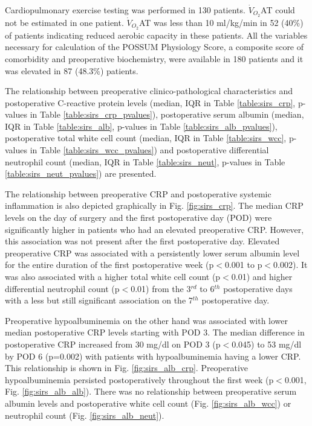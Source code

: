 Cardiopulmonary exercise testing was performed in 130 patients. 
$\dot{V}_{O_2}$AT could not be estimated in one patient.
$\dot{V}_{O_2}$AT was less than 10 ml/kg/min in 52 (40\%) of patients indicating reduced aerobic capacity in these patients.
All the variables necessary for calculation of the POSSUM Physiology Score, a composite score of comorbidity and preoperative biochemistry, were available in 180 patients and it was elevated in 87 (48.3\%) patients.

The relationship between preoperative clinico-pathological characteristics and postoperative C-reactive protein levels (median, IQR in Table \ref{table:sirs_crp}, p-values in Table \ref{table:sirs_crp_pvalues}), postoperative serum albumin (median, IQR in Table \ref{table:sirs_alb}, p-values in Table \ref{table:sirs_alb_pvalues}), postoperative total white cell count (median, IQR in Table \ref{table:sirs_wcc}, p-values in Table \ref{table:sirs_wcc_pvalues}) and postoperative differential neutrophil count (median, IQR in Table \ref{table:sirs_neut}, p-values in Table \ref{table:sirs_neut_pvalues}) are presented.

The relationship between preoperative CRP and postoperative systemic inflammation is also depicted graphically in Fig. \ref{fig:sirs_crp}. 
The median CRP levels on the day of surgery and the first postoperative day (POD) were significantly higher in patients who had an elevated preoperative CRP. 
However, this association was not present after the first postoperative day.
Elevated preoperative CRP was associated with a persistently lower serum albumin level for the entire duration of the first postoperative week (p$<$0.001 to p$<$0.002).
It was also associated with a higher total white cell count (p$<$0.01) and higher differential neutrophil count (p$<$0.01) from the 3$^{rd}$ to 6$^{th}$ postoperative days with a less but still significant association on the 7$^{th}$ postoperative day. 

Preoperative hypoalbuminemia on the other hand was associated with lower median postoperative CRP levels starting with POD 3. 
The median difference in postoperative CRP increased from 30 mg/dl on POD 3 (p$<$0.045) to 53 mg/dl by POD 6 (p=0.002) with patients with hypoalbuminemia having a lower CRP. 
This relationship is shown in Fig. \ref{fig:sirs_alb_crp}.
Preoperative hypoalbuminemia persisted postoperatively throughout the first week (p$<$0.001, Fig. \ref{fig:sirs_alb_alb}).
There was no relationship between preoperative serum albumin levels and postoperative white cell count (Fig. \ref{fig:sirs_alb_wcc}) or neutrophil count (Fig. \ref{fig:sirs_alb_neut}).


